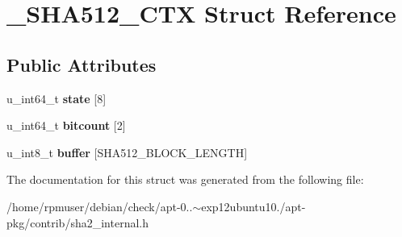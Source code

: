 \section{\-\_\-\-S\-H\-A512\-\_\-\-C\-T\-X \-Struct \-Reference}
\label{struct__SHA512__CTX}
\subsection*{\-Public \-Attributes}
\begin{DoxyCompactItemize}
\item 
u\-\_\-int64\-\_\-t {\bfseries state} [8]\label{struct__SHA512__CTX_a62b9d2d516bab6ae1753e695c829b2df}

\item 
u\-\_\-int64\-\_\-t {\bfseries bitcount} [2]\label{struct__SHA512__CTX_ad4fe1f3a5cbb9fa2169da8d1f43ec000}

\item 
u\-\_\-int8\-\_\-t {\bfseries buffer} [\-S\-H\-A512\-\_\-\-B\-L\-O\-C\-K\-\_\-\-L\-E\-N\-G\-T\-H]\label{struct__SHA512__CTX_a44f6438225a161c7cbbc5e11d3a92a80}

\end{DoxyCompactItemize}


\-The documentation for this struct was generated from the following file\-:\begin{DoxyCompactItemize}
\item 
/home/rpmuser/debian/check/apt-\/0..$\sim$exp12ubuntu10./apt-\/pkg/contrib/sha2\-\_\-internal.\-h\end{DoxyCompactItemize}
